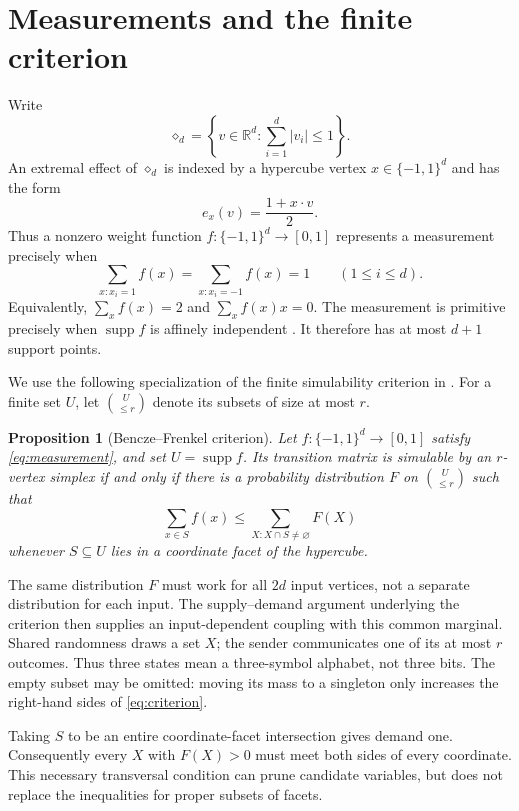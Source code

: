 \documentclass[11pt]{article}
\newtheorem{proposition}[theorem]{Proposition}
\newcommand{\R}{\mathbb R}
\newcommand{\supp}{\operatorname{supp}}
\begin{document}
\section{Measurements and the finite criterion}

Write
\[
 \diamond_d=\left\{v\in\R^d:\sum_{i=1}^d|v_i|\leq1\right\}.
\]
An extremal effect of $\diamond_d$ is indexed by a hypercube vertex
$x\in\{-1,1\}^d$ and has the form
\[
 e_x(v)=\frac{1+x\cdot v}{2}.
\]
Thus a nonzero weight function $f:\{-1,1\}^d\to[0,1]$ represents a
measurement precisely when
\begin{equation}\label{eq:measurement}
 \sum_{x:x_i=1} f(x)=\sum_{x:x_i=-1}f(x)=1
 \qquad(1\leq i\leq d).
\end{equation}
Equivalently, $\sum_x f(x)=2$ and $\sum_x f(x)x=0$. The measurement is
primitive precisely when $\supp f$ is affinely independent
\cite[Section~2]{BenczeFrenkel}. It therefore has at most $d+1$ support
points.

We use the following specialization of the finite simulability criterion in
\cite[Proposition~2.1]{BenczeFrenkel}. For a finite set $U$, let
$\binom{U}{\leq r}$ denote its subsets of size at most $r$.

\begin{proposition}[Bencze--Frenkel criterion]\label{prop:criterion}
Let $f:\{-1,1\}^d\to[0,1]$ satisfy \eqref{eq:measurement}, and set
$U=\supp f$. Its transition matrix is simulable by an $r$-vertex simplex if
and only if there is a probability distribution $F$ on
$\binom{U}{\leq r}$ such that
\begin{equation}\label{eq:criterion}
 \sum_{x\in S}f(x)
 \leq \sum_{X:X\cap S\ne\varnothing}F(X)
\end{equation}
whenever $S\subseteq U$ lies in a coordinate facet of the hypercube.
\end{proposition}

The same distribution $F$ must work for all $2d$ input vertices, not a separate
distribution for each input. The supply--demand argument underlying the
criterion then supplies an input-dependent coupling with this common marginal.
Shared randomness draws a set $X$; the sender communicates one of its at most
$r$ outcomes. Thus three states mean a three-symbol alphabet, not three bits.
The empty subset may be omitted: moving its mass to a singleton only increases
the right-hand sides of \eqref{eq:criterion}.

Taking $S$ to be an entire coordinate-facet intersection gives demand one.
Consequently every $X$ with $F(X)>0$ must meet both sides of every coordinate.
This necessary transversal condition can prune candidate variables, but does
not replace the inequalities for proper subsets of facets.
\end{document}
